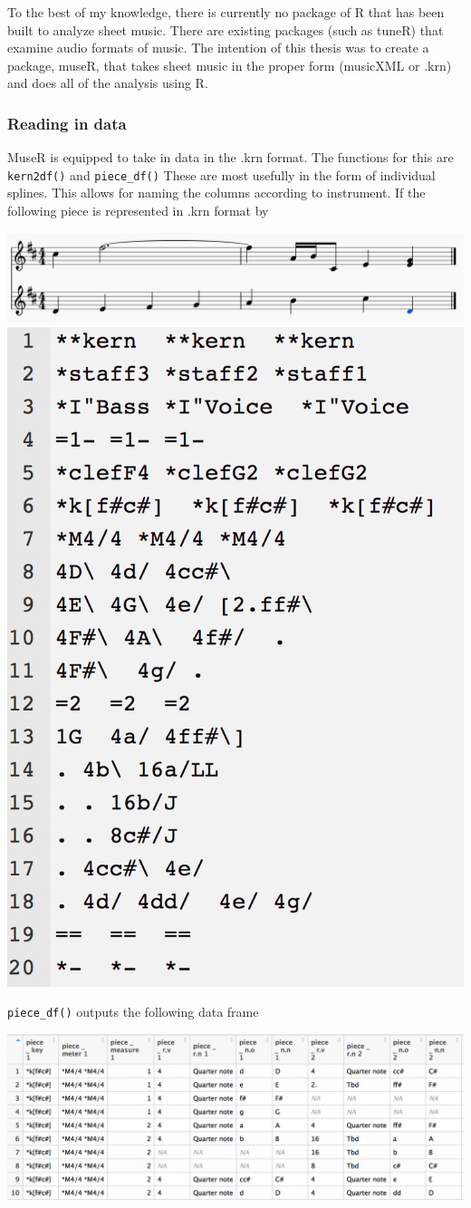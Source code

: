 \documentclass[12pt,twoside]{reedthesis}
\theoremstyle{definition}
\theoremstyle{definition}
\theoremstyle{definition}
\theoremstyle{remark}
\begin{document}
To the best of my knowledge, there is currently no package of R that has
been built to analyze sheet music. There are existing packages (such as
tuneR) that examine audio formats of music. The intention of this thesis
was to create a package, museR, that takes sheet music in the proper
form (musicXML or .krn) and does all of the analysis using R.

\subsubsection{Reading in data}\label{reading-in-data}

MuseR is equipped to take in data in the .krn format. The functions for
this are \texttt{kern2df()} and \texttt{piece\_df()} These are most
usefully in the form of individual splines. This allows for naming the
columns according to instrument. If the following piece is represented
in .krn format by

\includegraphics[width=0.5\linewidth]{images/ex1m}
\includegraphics[width=0.5\linewidth]{images/ex1k}

\texttt{piece\_df()} outputs the following data frame

\includegraphics[width=0.75\linewidth]{images/ex1r}
\end{document}
